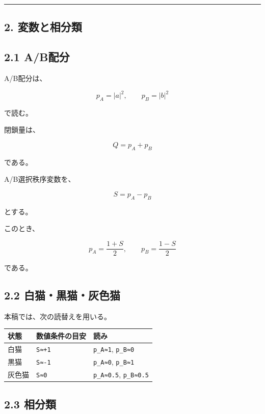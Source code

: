 \documentclass{article}
\newcounter{none}
\begin{document}
\begin{center}\rule{0.5\linewidth}{0.5pt}\end{center}

\subsection{2. 変数と相分類}\label{ux5909ux6570ux3068ux76f8ux5206ux985e}

\subsection{2.1 A/B配分}\label{abux914dux5206}

A/B配分は、

\[
p_A=|a|^2,\qquad p_B=|b|^2
\]

で読む。

閉鎖量は、

\[
Q=p_A+p_B
\]

である。

A/B選択秩序変数を、

\[
S=p_A-p_B
\]

とする。

このとき、

\[
p_A=\frac{1+S}{2},
\qquad
p_B=\frac{1-S}{2}
\]

である。

\subsection{2.2
白猫・黒猫・灰色猫}\label{ux767dux732bux9ed2ux732bux7070ux8272ux732b}

本稿では、次の読替えを用いる。

{\def\LTcaptype{none} %
\begin{longtable}[]{@{}lll@{}}
\toprule\noalign{}
状態 & 数値条件の目安 & 読み \\
\midrule\noalign{}
\endhead
\bottomrule\noalign{}
\endlastfoot
白猫 & \texttt{S≈+1} & \texttt{p\_A≈1}, \texttt{p\_B≈0} \\
黒猫 & \texttt{S≈-1} & \texttt{p\_A≈0}, \texttt{p\_B≈1} \\
灰色猫 & \texttt{S≈0} & \texttt{p\_A≈0.5}, \texttt{p\_B≈0.5} \\
\end{longtable}
}

\subsection{2.3 相分類}\label{ux76f8ux5206ux985e}
\end{document}

